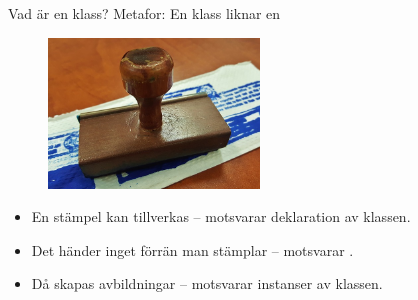 \begin{Slide}{Vad är en klass?}\SlideFontSmall
Metafor: En klass liknar en 
\begin{figure}
\centering
\includegraphics[width=0.5\textwidth]{../img/stamp}
\end{figure}
\begin{itemize}
\item En stämpel kan tillverkas -- motsvarar deklaration av klassen. 
 \item Det händer inget förrän man stämplar -- motsvarar .
\item Då skapas avbildningar -- motsvarar instanser av klassen.


\end{itemize}
\end{Slide}


